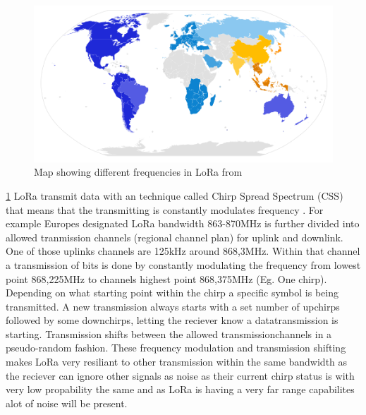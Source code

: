 \documentclass[article,a4paper]{IEEEtran}
\begin{document}
    \begin{figure}
        \includegraphics[width=\columnwidth]{LoRaWANdivide.png} 
        \caption{Map showing different frequencies in LoRa from \cite{LoRaWanfreqCountry}}
        \label{fig3:freq LoRaWAN}   
    \end{figure}
    \ref{fig3:freq LoRaWAN}
    LoRa transmit data with an technique called Chirp Spread Spectrum (CSS) that means that the transmitting is constantly modulates frequency \cite{LoraWanSpecOverview, LoRaTutorial}. For example Europes designated LoRa bandwidth 863-870MHz is further divided into allowed tranmission channels (regional channel plan) for uplink and downlink. One of those uplinks channels are 125kHz around 868,3MHz. Within that channel a transmission of bits is done by constantly modulating the frequency from lowest point 868,225MHz to channels highest point 868,375MHz (Eg. One chirp). Depending on what starting point within the chirp a specific symbol is being transmitted. A new transmission always starts with a set number of upchirps followed by some downchirps, letting the reciever know a datatransmission is starting. Transmission shifts between the allowed transmissionchannels in a pseudo-random fashion. These frequency modulation and transmission shifting makes LoRa very resiliant to other transmission within the same bandwidth as the reciever can ignore other signals as noise as their current chirp status is with very low propability the same and as LoRa is having a very far range capabilites alot of noise will be present.      
    \newline\newline
\end{document}
